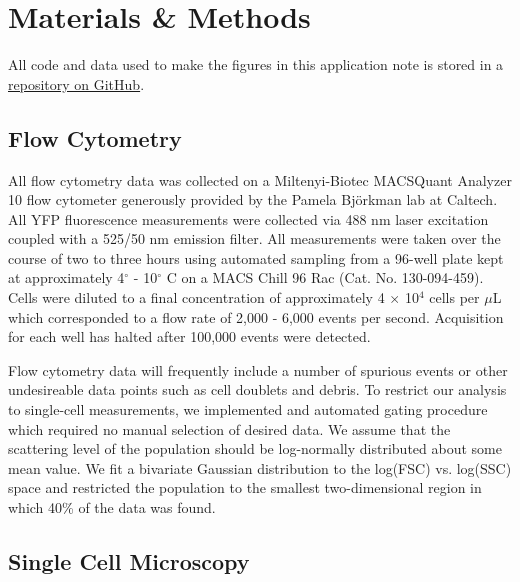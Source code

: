 \documentclass[letterpaper, 10pt]{article}
\begin{document}
\section*{Materials \& Methods}

All code and data used to make the figures in this application note is stored
in a \href{http://www.github.com/rpgroup-pboc/physical_flow_cytometry}{repository on GitHub}.

\subsection*{Flow Cytometry}
All flow cytometry data was collected on a Miltenyi-Biotec MACSQuant Analyzer
10  flow cytometer generously provided by the Pamela Bj\"{o}rkman lab at
Caltech. All  YFP fluorescence measurements were collected via 488 nm laser
excitation coupled with a 525/50 nm emission filter. All measurements were
taken over the course of two to three hours using automated sampling from a
96-well plate kept at approximately 4$^\circ$ - 10$^\circ$ C on a MACS Chill
96 Rac (Cat. No. 130-094-459). Cells were diluted to a final concentration of
approximately 4 $\times$ 10$^4$ cells per $\mu$L which corresponded to a flow
rate of 2,000 - 6,000 events per second. Acquisition for each well has halted
after 100,000 events were detected.

Flow cytometry data will frequently include a number of spurious events or other
undesireable data points such as cell doublets and debris. To restrict our
analysis to single-cell measurements, we implemented and automated gating
procedure which required no manual selection of desired data. We assume that
the scattering level of the population should be log-normally distributed about
some mean value. We fit a bivariate Gaussian distribution to the log(FSC) vs.
log(SSC) space and restricted the population  to the smallest two-dimensional
region in which 40\% of the data was found.

\subsection*{Single Cell Microscopy}
\end{document}
